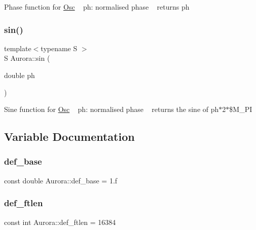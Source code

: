 Phase function for \hyperlink{class_aurora_1_1_osc}{Osc} ~\newline
ph\+: normalised phase ~\newline
returns ph \mbox{\label{namespace_aurora_a388ea5736944d8887f5586afd45a03b8}} 
\subsubsection{\texorpdfstring{sin()}{sin()}}
{\footnotesize\ttfamily template$<$typename S $>$ \\
S Aurora\+::sin (\begin{DoxyParamCaption}\item[{double}]{ph }\end{DoxyParamCaption})}

Sine function for \hyperlink{class_aurora_1_1_osc}{Osc} ~\newline
ph\+: normalised phase ~\newline
returns the sine of ph$\ast$2$\ast$\$\+M\+\_\+\+PI 

\subsection{Variable Documentation}
\mbox{\label{namespace_aurora_acb267dff62f74484893c2d5b679b78bf}} 
\subsubsection{\texorpdfstring{def\+\_\+base}{def\_base}}
{\footnotesize\ttfamily const double Aurora\+::def\+\_\+base = 1.f}

\mbox{\label{namespace_aurora_a14dabfd9feedfa09c0e6f86d2627f006}} 
\subsubsection{\texorpdfstring{def\+\_\+ftlen}{def\_ftlen}}
{\footnotesize\ttfamily const int Aurora\+::def\+\_\+ftlen = 16384}

\mbox{\label{namespace_aurora_a09d7b7aef171c72e46db6eac0226636b}} 
